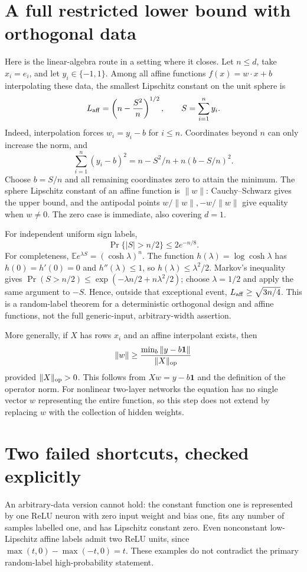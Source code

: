 \documentclass[11pt]{article}
\begin{document}
\section{A full restricted lower bound with orthogonal data}
Here is the linear-algebra route in a setting where it closes.
Let $n\le d$, take $x_i=e_i$, and let $y_i\in\{-1,1\}$. Among
all affine functions $f(x)=w\cdot x+b$ interpolating these data,
the smallest Lipschitz constant on the unit sphere is
\[
 L_{\rm aff}=\left(n-\frac{S^2}{n}\right)^{1/2},
 \qquad S=\sum_{i=1}^n y_i.
\]
Indeed, interpolation forces $w_i=y_i-b$ for $i\le n$.
Coordinates beyond $n$ can only increase the norm, and
\[
 \sum_{i=1}^n(y_i-b)^2
 =n-S^2/n+n(b-S/n)^2.
\]
Choose $b=S/n$ and all remaining coordinates zero to attain the
minimum. The sphere Lipschitz constant of an affine function is
$\|w\|$: Cauchy--Schwarz gives the upper bound, and the antipodal
points $w/\|w\|,-w/\|w\|$ give equality when $w\ne0$.
The zero case is immediate, also covering $d=1$.

For independent uniform sign labels,
\[
 \Pr\{|S|>n/2\}\le2e^{-n/8}.
\]
For completeness, $\mathbb E e^{\lambda S}=(\cosh\lambda)^n$.
The function $h(\lambda)=\log\cosh\lambda$ has $h(0)=h'(0)=0$
and $h''(\lambda)\le1$, so $h(\lambda)\le\lambda^2/2$.
Markov's inequality gives
$\Pr(S>n/2)\le\exp(-\lambda n/2+n\lambda^2/2)$;
choose $\lambda=1/2$ and apply the same argument to $-S$.
Hence, outside that exceptional event,
$L_{\rm aff}\ge\sqrt{3n/4}$. This is a random-label theorem
for a deterministic orthogonal design and affine functions,
not the full generic-input, arbitrary-width assertion.

More generally, if $X$ has rows $x_i$ and an affine interpolant
exists, then
\[
 \|w\|\ge\frac{\min_b\|y-b\boldsymbol{1}\|}{\|X\|_{\rm op}}
\]
provided $\|X\|_{\rm op}>0$. This follows from
$Xw=y-b\boldsymbol{1}$ and the definition of the operator norm.
For nonlinear two-layer networks the equation has no single vector
$w$ representing the entire function, so this step does not extend
by replacing $w$ with the collection of hidden weights.

\section{Two failed shortcuts, checked explicitly}
An arbitrary-data version cannot hold: the constant function one
is represented by one ReLU neuron with zero input weight and bias
one, fits any number of samples labelled one, and has Lipschitz
constant zero. Even nonconstant low-Lipschitz affine labels admit
two ReLU units, since
$\max(t,0)-\max(-t,0)=t$. These examples do not contradict the
primary random-label high-probability statement.
\end{document}
